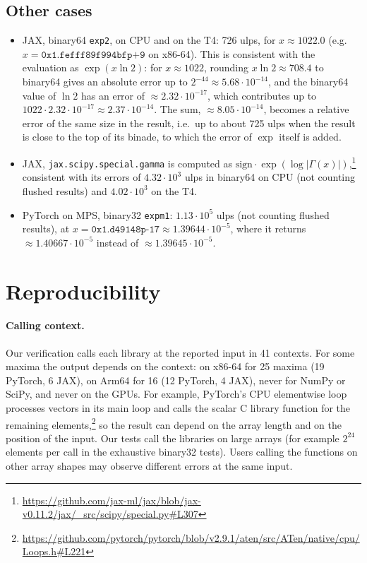 \documentclass[11pt,a4paper]{article}
\begin{document}
\subsection{Other cases}
\begin{itemize}
\item JAX, binary64 \texttt{exp2}, on CPU and on the T4: 726 ulps, for $x\approx 1022.0$ (e.g.\ $x=\texttt{0x1.fefff89f994bfp+9}$ on x86-64). This is consistent with the evaluation as $\exp(x\ln 2)$: for $x\approx 1022$, rounding $x\ln 2\approx 708.4$ to binary64 gives an absolute error up to $2^{-44}\approx 5.68\cdot10^{-14}$, and the binary64 value of $\ln 2$ has an error of $\approx 2.32\cdot10^{-17}$, which contributes up to $1022\cdot 2.32\cdot10^{-17}\approx 2.37\cdot10^{-14}$. The sum, $\approx 8.05\cdot10^{-14}$, becomes a relative error of the same size in the result, i.e.\ up to about 725 ulps when the result is close to the top of its binade, to which the error of $\exp$ itself is added.
\item JAX, \texttt{jax.scipy.special.gamma} is computed as $\mathrm{sign}\cdot\exp(\log|\Gamma(x)|)$,\footnote{\url{https://github.com/jax-ml/jax/blob/jax-v0.11.2/jax/_src/scipy/special.py\#L307}} consistent with its errors of $4.32\cdot10^3$ ulps in binary64 on CPU (not counting flushed results) and $4.02\cdot10^3$ on the T4.
\item PyTorch on MPS, binary32 \texttt{expm1}: $1.13\cdot10^5$ ulps (not counting flushed results), at $x=\texttt{0x1.d49148p-17}\approx 1.39644\cdot10^{-5}$, where it returns $\approx 1.40667\cdot10^{-5}$ instead of $\approx 1.39645\cdot10^{-5}$.
\end{itemize}

\section{Reproducibility}\label{sec:repro}
\paragraph{Calling context.} Our verification calls each library at the reported input in 41 contexts. For some maxima the output depends on the context: on x86-64 for 25 maxima (19 PyTorch, 6 JAX), on Arm64 for 16 (12 PyTorch, 4 JAX), never for NumPy or SciPy, and never on the GPUs. For example, PyTorch's CPU elementwise loop processes vectors in its main loop and calls the scalar C library function for the remaining elements,\footnote{\url{https://github.com/pytorch/pytorch/blob/v2.9.1/aten/src/ATen/native/cpu/Loops.h\#L221}} so the result can depend on the array length and on the position of the input. Our tests call the libraries on large arrays (for example $2^{24}$ elements per call in the exhaustive binary32 tests). Users calling the functions on other array shapes may observe different errors at the same input.
\end{document}
